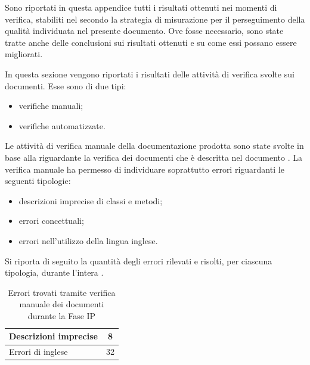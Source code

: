 
	Sono riportati in questa appendice tutti i risultati ottenuti nei momenti di verifica, stabiliti nel  secondo la strategia di misurazione per il perseguimento della qualità individuata nel presente documento. Ove fosse necessario, sono state tratte anche delle conclusioni sui risultati ottenuti e su come essi possano essere migliorati.

			In questa sezione vengono riportati i risultati delle attività di verifica svolte sui documenti. Esse sono di due tipi:
			\begin{itemize}
				\item verifiche manuali;
				\item verifiche automatizzate.
			\end{itemize}
				Le attività di verifica manuale della documentazione prodotta sono state svolte in base alla  riguardante la verifica dei documenti che è descritta nel documento .
				La verifica manuale ha permesso di individuare soprattutto errori riguardanti le seguenti tipologie:
				\begin{itemize}
					\item descrizioni imprecise di classi e metodi;
					\item errori concettuali;
					\item errori nell'utilizzo della lingua inglese.
				\end{itemize}
				Si riporta di seguito la quantità degli errori rilevati e risolti, per ciascuna tipologia, durante l'intera .
				\begin{table}[H]
					\centering
						\begin{tabu}{| l | c |}
							\hline
								Descrizioni imprecise	&	8\\ \hline
								Errori di inglese  &  32\\ \hline
						\end{tabu}
						\caption{Errori trovati tramite verifica manuale dei documenti durante la Fase IP}
				\end{table}

